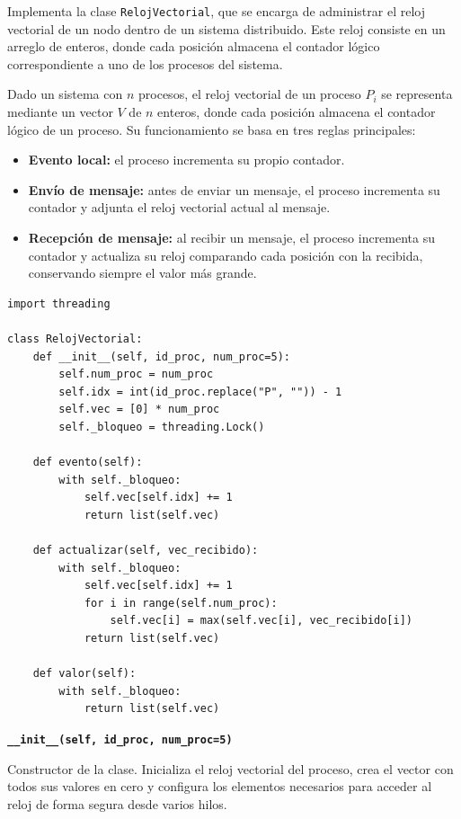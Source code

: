 \documentclass[letterpaper,11pt]{article}
\begin{document}
Implementa la clase \texttt{RelojVectorial}, que se encarga de administrar 
el reloj vectorial de un nodo dentro de un sistema distribuido. Este reloj 
consiste en un arreglo de enteros, donde cada posición almacena el contador 
lógico correspondiente a uno de los procesos del sistema.

Dado un sistema con $n$ procesos, el reloj vectorial de un proceso 
$P_i$ se representa mediante un vector $V$ de $n$ enteros, donde cada 
posición almacena el contador lógico de un proceso. Su funcionamiento se 
basa en tres reglas principales:

\begin{itemize}
    \item \textbf{Evento local:} el proceso incrementa su propio contador.
    \item \textbf{Envío de mensaje:} antes de enviar un mensaje, el proceso 
    incrementa su contador y adjunta el reloj vectorial actual al mensaje.
    \item \textbf{Recepción de mensaje:} al recibir un mensaje, el proceso 
    incrementa su contador y actualiza su reloj comparando cada posición con 
    la recibida, conservando siempre el valor más grande.
\end{itemize}



\begin{lstlisting}[style=python, caption={vectorial.py — Implementación del Reloj Vectorial}]
import threading
 
class RelojVectorial:
    def __init__(self, id_proc, num_proc=5):
        self.num_proc = num_proc
        self.idx = int(id_proc.replace("P", "")) - 1
        self.vec = [0] * num_proc
        self._bloqueo = threading.Lock()
 
    def evento(self):
        with self._bloqueo:
            self.vec[self.idx] += 1
            return list(self.vec)
 
    def actualizar(self, vec_recibido):
        with self._bloqueo:
            self.vec[self.idx] += 1
            for i in range(self.num_proc):
                self.vec[i] = max(self.vec[i], vec_recibido[i])
            return list(self.vec)
 
    def valor(self):
        with self._bloqueo:
            return list(self.vec)
\end{lstlisting}

\textbf{\texttt{\_\_init\_\_(self, id\_proc, num\_proc=5)}}

Constructor de la clase. Inicializa el reloj vectorial del proceso, crea
el vector con todos sus valores en cero y configura los elementos
necesarios para acceder al reloj de forma segura desde varios hilos.
\end{document}
